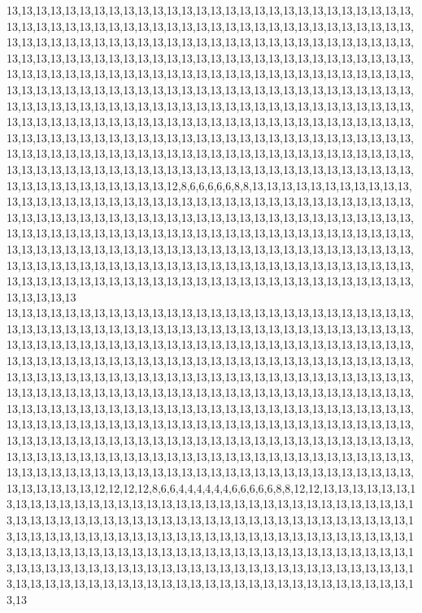 13,13,13,13,13,13,13,13,13,13,13,13,13,13,13,13,13,13,13,13,13,13,13,13,13,13,13,13,13,13,13,13,13,13,13,13,13,13,13,13,13,13,13,13,13,13,13,13,13,13,13,13,13,13,13,13,13,13,13,13,13,13,13,13,13,13,13,13,13,13,13,13,13,13,13,13,13,13,13,13,13,13,13,13,13,13,13,13,13,13,13,13,13,13,13,13,13,13,13,13,13,13,13,13,13,13,13,13,13,13,13,13,13,13,13,13,13,13,13,13,13,13,13,13,13,13,13,13,13,13,13,13,13,13,13,13,13,13,13,13,13,13,13,13,13,13,13,13,13,13,13,13,13,13,13,13,13,13,13,13,13,13,13,13,13,13,13,13,13,13,13,13,13,13,13,13,13,13,13,13,13,13,13,13,13,13,13,13,13,13,13,13,13,13,13,13,13,13,13,13,13,13,13,13,13,13,13,13,13,13,13,13,13,13,13,13,13,13,13,13,13,13,13,13,13,13,13,13,13,13,13,13,13,13,13,13,13,13,13,13,13,13,13,13,13,13,13,13,13,13,13,13,13,13,13,13,13,13,13,13,13,13,13,13,13,13,13,13,13,13,13,13,13,13,13,13,13,13,13,13,13,13,13,13,13,13,13,13,13,13,13,13,13,13,13,13,13,13,13,13,13,13,13,13,13,13,13,13,13,13,13,13,13,13,13,13,13,13,13,12,8,6,6,6,6,6,8,8,13,13,13,13,13,13,13,13,13,13,13,13,13,13,13,13,13,13,13,13,13,13,13,13,13,13,13,13,13,13,13,13,13,13,13,13,13,13,13,13,13,13,13,13,13,13,13,13,13,13,13,13,13,13,13,13,13,13,13,13,13,13,13,13,13,13,13,13,13,13,13,13,13,13,13,13,13,13,13,13,13,13,13,13,13,13,13,13,13,13,13,13,13,13,13,13,13,13,13,13,13,13,13,13,13,13,13,13,13,13,13,13,13,13,13,13,13,13,13,13,13,13,13,13,13,13,13,13,13,13,13,13,13,13,13,13,13,13,13,13,13,13,13,13,13,13,13,13,13,13,13,13,13,13,13,13,13,13,13,13,13,13,13,13,13,13,13,13,13,13,13,13,13,13,13,13,13,13,13,13,13,13,13,13
13,13,13,13,13,13,13,13,13,13,13,13,13,13,13,13,13,13,13,13,13,13,13,13,13,13,13,13,13,13,13,13,13,13,13,13,13,13,13,13,13,13,13,13,13,13,13,13,13,13,13,13,13,13,13,13,13,13,13,13,13,13,13,13,13,13,13,13,13,13,13,13,13,13,13,13,13,13,13,13,13,13,13,13,13,13,13,13,13,13,13,13,13,13,13,13,13,13,13,13,13,13,13,13,13,13,13,13,13,13,13,13,13,13,13,13,13,13,13,13,13,13,13,13,13,13,13,13,13,13,13,13,13,13,13,13,13,13,13,13,13,13,13,13,13,13,13,13,13,13,13,13,13,13,13,13,13,13,13,13,13,13,13,13,13,13,13,13,13,13,13,13,13,13,13,13,13,13,13,13,13,13,13,13,13,13,13,13,13,13,13,13,13,13,13,13,13,13,13,13,13,13,13,13,13,13,13,13,13,13,13,13,13,13,13,13,13,13,13,13,13,13,13,13,13,13,13,13,13,13,13,13,13,13,13,13,13,13,13,13,13,13,13,13,13,13,13,13,13,13,13,13,13,13,13,13,13,13,13,13,13,13,13,13,13,13,13,13,13,13,13,13,13,13,13,13,13,13,13,13,13,13,13,13,13,13,13,13,13,13,13,13,13,13,13,13,13,13,13,13,13,13,13,13,13,13,13,13,13,13,13,13,13,13,12,12,12,12,8,6,6,4,4,4,4,4,4,6,6,6,6,6,8,8,12,12,13,13,13,13,13,13,13,13,13,13,13,13,13,13,13,13,13,13,13,13,13,13,13,13,13,13,13,13,13,13,13,13,13,13,13,13,13,13,13,13,13,13,13,13,13,13,13,13,13,13,13,13,13,13,13,13,13,13,13,13,13,13,13,13,13,13,13,13,13,13,13,13,13,13,13,13,13,13,13,13,13,13,13,13,13,13,13,13,13,13,13,13,13,13,13,13,13,13,13,13,13,13,13,13,13,13,13,13,13,13,13,13,13,13,13,13,13,13,13,13,13,13,13,13,13,13,13,13,13,13,13,13,13,13,13,13,13,13,13,13,13,13,13,13,13,13,13,13,13,13,13,13,13,13,13,13,13,13,13,13,13,13,13,13,13,13,13,13,13,13,13,13,13,13,13,13
